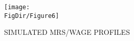 \hypertarget{SimulatedMRS}{}
\begin{figure}[tbp]
  \centerline{\texttt{[image: \\FigDir/Figure6]}}
  \caption{SIMULATED MRS/WAGE PROFILES}
  \label{fig:SimulatedMRS}
\end{figure}
